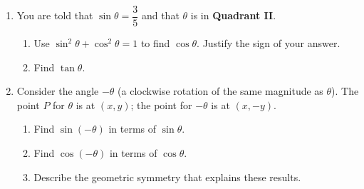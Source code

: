 \documentclass[10pt]{article}
\begin{document}
\begin{tcolorbox}[colback=white, colframe=black!40,
    title=\textbf{Tier E --- Extend: Using the Pythagorean Identity},
    fonttitle=\bfseries, arc=2mm, left=4mm, right=4mm, top=3mm, bottom=3mm]

\begin{enumerate}[leftmargin=1.8em, itemsep=6pt]
  \item You are told that $\sin\theta = \dfrac{3}{5}$ and that $\theta$ is in \textbf{Quadrant II}.
        \begin{enumerate}[leftmargin=1.4em, itemsep=3pt]
          \item[(a)] Use $\sin^2\theta + \cos^2\theta = 1$ to find $\cos\theta$.
                Justify the sign of your answer. \vspace{0.55in}
          \item[(b)] Find $\tan\theta$. \vspace{0.35in}
        \end{enumerate}

  \item Consider the angle $-\theta$ (a clockwise rotation of the same magnitude as $\theta$).
        The point $P$ for $\theta$ is at $(x, y)$; the point for $-\theta$ is at $(x, -y)$.
        \begin{enumerate}[leftmargin=1.4em, itemsep=3pt]
          \item[(a)] Find $\sin(-\theta)$ in terms of $\sin\theta$. \vspace{0.28in}
          \item[(b)] Find $\cos(-\theta)$ in terms of $\cos\theta$. \vspace{0.28in}
          \item[(c)] Describe the geometric symmetry that explains these results. \vspace{0.30in}
        \end{enumerate}
\end{enumerate}
\end{tcolorbox}
\end{document}
